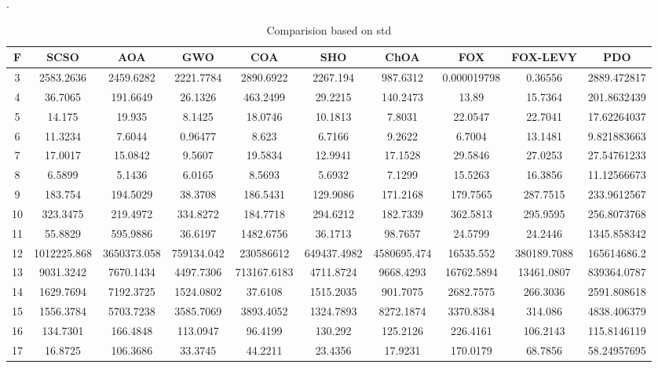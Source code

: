 \documentclass[
]{article}
\begin{document}
\begin{justify}
{  
 .



\begin{table}[h!]
\caption{Comparision based on std}
\scriptsize %
\begin{tabular}{||c c c c c c c c c c||}
\hline
F & SCSO  & AOA & GWO & COA & SHO & ChOA & FOX & FOX-LEVY & PDO\\ [1ex]
\hline\hline
3 & 2583.2636 & 2459.6282 & 2221.7784 & 2890.6922 & 2267.194 & 987.6312 & 0.000019798 & 0.36556 & 2889.472817 \\
4 & 36.7065 & 191.6649 & 26.1326 & 463.2499 & 29.2215 & 140.2473 & 13.89 & 15.7364 & 201.8632439 \\
5 & 14.175 & 19.935 & 8.1425 & 18.0746 & 10.1813 & 7.8031 & 22.0547 & 22.7041 & 17.62264037 \\
6 & 11.3234 & 7.6044 & 0.96477 & 8.623 & 6.7166 & 9.2622 & 6.7004 & 13.1481 & 9.821883663 \\
7 & 17.0017 & 15.0842 & 9.5607 & 19.5834 & 12.9941 & 17.1528 & 29.5846 & 27.0253 & 27.54761233 \\
8 & 6.5899 & 5.1436 & 6.0165 & 8.5693 & 5.6932 & 7.1299 & 15.5263 & 16.3856 & 11.12566673 \\
9 & 183.754 & 194.5029 & 38.3708 & 186.5431 & 129.9086 & 171.2168 & 179.7565 & 287.7515 & 233.9612567 \\
10 & 323.3475 & 219.4972 & 334.8272 & 184.7718 & 294.6212 & 182.7339 & 362.5813 & 295.9595 & 256.8073768 \\
11 & 55.8829 & 595.9886 & 36.6197 & 1482.6756 & 36.1713 & 98.7657 & 24.5799 & 24.2446 & 1345.858342 \\
12 & 1012225.868 & 3650373.058 & 759134.042 & 230586612 & 649437.4982 & 4580695.474 & 16535.552 & 380189.7088 & 165614686.2 \\
13 & 9031.3242 & 7670.1434 & 4497.7306 & 713167.6183 & 4711.8724 & 9668.4293 & 16762.5894 & 13461.0807 & 839364.0787 \\
14 & 1629.7694 & 7192.3725 & 1524.0802 & 37.6108 & 1515.2035 & 901.7075 & 2682.7575 & 266.3036 & 2591.808618 \\
15 & 1556.3784 & 5703.7238 & 3585.7069 & 3893.4052 & 1324.7893 & 8272.1874 & 3370.8384 & 314.086 & 4838.406379 \\
16 & 134.7301 & 166.4848 & 113.0947 & 96.4199 & 130.292 & 125.2126 & 226.4161 & 106.2143 & 115.8146119 \\
17 & 16.8725 & 106.3686 & 33.3745 & 44.2211 & 23.4356 & 17.9231 & 170.0179 & 68.7856 & 58.24957695 \\

\end{tabular}
\end{table}}
\end{justify}
\end{document}
